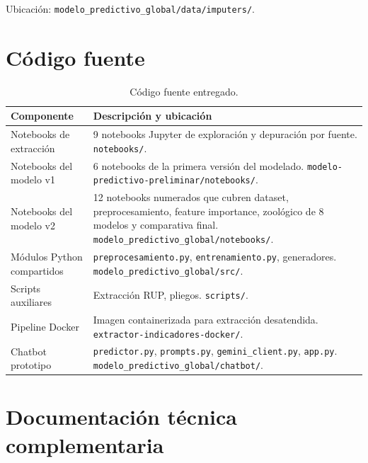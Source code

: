 \documentclass[12pt,letterpaper,oneside]{report}
\begin{document}
Ubicación: \texttt{modelo\_predictivo\_global/data/imputers/}.

\section{Código fuente}

\begin{table}[H]
\centering
\caption{Código fuente entregado.}
\label{tab:codigo_entregado}
\small
\begin{tabular}{p{5cm}p{9cm}}
\toprule
\textbf{Componente} & \textbf{Descripción y ubicación} \\
\midrule
Notebooks de extracción & 9 notebooks Jupyter de exploración y depuración por fuente. \texttt{notebooks/}. \\
Notebooks del modelo v1 & 6 notebooks de la primera versión del modelado. \texttt{modelo-predictivo-preliminar/notebooks/}. \\
Notebooks del modelo v2 & 12 notebooks numerados que cubren dataset, preprocesamiento, feature importance, zoológico de 8 modelos y comparativa final. \texttt{modelo\_predictivo\_global/notebooks/}. \\
Módulos Python compartidos & \texttt{preprocesamiento.py}, \texttt{entrenamiento.py}, generadores. \texttt{modelo\_predictivo\_global/src/}. \\
Scripts auxiliares & Extracción RUP, pliegos. \texttt{scripts/}. \\
Pipeline Docker & Imagen containerizada para extracción desatendida. \texttt{extractor-indicadores-docker/}. \\
Chatbot prototipo & \texttt{predictor.py}, \texttt{prompts.py}, \texttt{gemini\_client.py}, \texttt{app.py}. \texttt{modelo\_predictivo\_global/chatbot/}. \\
\bottomrule
\end{tabular}
\end{table}

\section{Documentación técnica complementaria}
\end{document}
